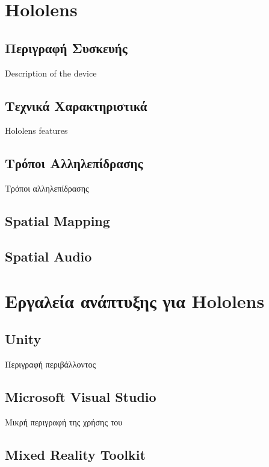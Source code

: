 \section{Hololens}\label{sec:hololensDesc}

\subsection{Περιγραφή Συσκευής}
Description of the device

\subsection{Τεχνικά Χαρακτηριστικά}
Hololens features

\subsection{Τρόποι Αλληλεπίδρασης}
Τρόποι αλληλεπίδρασης

\subsection{Spatial Mapping}

\subsection{Spatial Audio}


\section{Εργαλεία ανάπτυξης για Hololens}\label{sec:hololensTools}

\subsection{Unity}
Περιγραφή περιβάλλοντος

\subsection{Microsoft Visual Studio}
Μικρή περιγραφή της χρήσης του

\subsection{Mixed Reality Toolkit}

